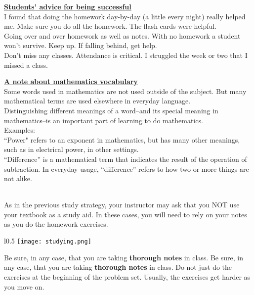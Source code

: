 \documentclass[12pt a4paper]{article}
\begin{document}
\begin{dashedbox}
\vspace{0.3cm}
\LARGE \textbf{\uline{Students' advice for being successful}} \\
\LARGE I found that doing the homework day-by-day (a little every night) really helped me. Make sure you do all the homework.
The flash cards were helpful. \\
Going over and over homework as well as notes. With no homework a student won’t survive. Keep up. If falling behind, get help. \\
Don’t miss any classes. Attendance is critical. I struggled the week or two that I missed a class.
\vspace{0.3cm}
\end{dashedbox}

\newpage

\begin{dashedbox}
\vspace{0.3cm}
\LARGE \textbf{\uline{A note about mathematics vocabulary }} \\
\LARGE Some words used in mathematics are not used outside of the subject. But many mathematical terms are used elsewhere in everyday language. \\ Distinguishing different meanings of a word--and its special meaning in mathematics--is an important part of learning to do mathematics. \vspace{0.3cm} \\
Examples: \\
“Power" refers to an exponent in mathematics, but has many other meanings, such as in electrical power, in other settings. 
\vspace{0.3cm} \\
“Difference” is a mathematical term that indicates the result of the operation of subtraction. In everyday usage, “difference” refers to how two or more things are not alike. 
\vspace{0.3cm} \\
 \\
\vspace{0.3cm}

\end{dashedbox}

\newpage


\noindent \LARGE
As in the previous study strategy, your instructor may ask that you NOT use your textbook as a study aid. In these cases, you will need to rely on your notes as you do the homework exercises.
\begin{wrapfigure}{l}{0.5\textwidth}
    \centering
    \texttt{[image: studying.png]}
    \label{fig: Maths}
\end{wrapfigure} \newline
Be sure, in any case, that you are taking \textbf{thorough notes} in class. Be sure, in any case, that you are taking \textbf{thorough notes} in class. Do not just do the exercises at the beginning of the problem set. Usually, the exercises get harder as you move on.
\\
\end{document}
